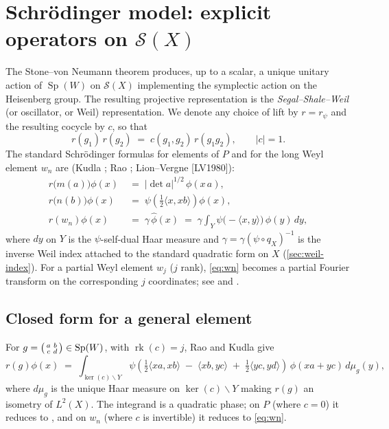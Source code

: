 \documentclass[11pt,letterpaper]{article}
\newcommand{\Sp}{\operatorname{Sp}}
\newcommand{\rk}{\operatorname{rk}}
\newcommand{\Schwartz}{\mathcal{S}}
\newcommand{\inv}{^{-1}}
\theoremstyle{plain}
\theoremstyle{definition}
\begin{document}
\section{Schr\"odinger model: explicit operators on \texorpdfstring{$\Schwartz(X)$}{S(X)}}
\label{sec:schrodinger}

The Stone--von Neumann theorem produces, up to a scalar, a unique unitary action of $\Sp(W)$ on $\Schwartz(X)$ implementing the symplectic action on the Heisenberg group. The resulting projective representation is the \emph{Segal--Shale--Weil} (or oscillator, or Weil) representation. We denote any choice of lift by $r = r_\psi$ and the resulting cocycle by $c$, so that
\begin{equation}\label{eq:cocycle-defining}
r(g_1)\,r(g_2) \;=\; c(g_1,g_2)\,r(g_1 g_2),\qquad |c| = 1.
\end{equation}
The standard Schr\"odinger formulas for elements of $P$ and for the long Weyl element $w_n$ are (Kudla \cite[Ch.~II, Prop.~2.3]{Kudla1996}; Rao \cite[\S 3]{Rao1993}; Lion--Vergne [LV1980]):
\begin{align}
r\bigl(m(a)\bigr)\phi(x) &\;=\; |\det a|^{1/2}\,\phi(x\,a),
\label{eq:Levi}\\[2pt]
r\bigl(n(b)\bigr)\phi(x) &\;=\; \psi\!\left(\tfrac{1}{2}\langle x,xb\rangle\right)\phi(x),
\label{eq:N}\\[2pt]
r(w_n)\phi(x) &\;=\; \gamma\,\widehat{\phi}(x)
\;=\; \gamma\int_{Y}\psi\bigl(-\langle x,y\rangle\bigr)\,\phi(y)\,dy,
\label{eq:wn}
\end{align}
where $dy$ on $Y$ is the $\psi$-self-dual Haar measure and $\gamma = \gamma(\psi\circ q_X)\inv$ is the inverse Weil index attached to the standard quadratic form on $X$ (\cref{sec:weil-index}). For a partial Weyl element $w_j$ ($j$ rank), \cref{eq:wn} becomes a partial Fourier transform on the corresponding $j$ coordinates; see \cite[\S 3]{Rao1993} and \cite[Ch.~I]{Kudla1996}.

\subsection*{Closed form for a general element}

For $g = \begin{psmallmatrix} a & b \\ c & d \end{psmallmatrix} \in \Sp(W)$, with $\rk(c) = j$, Rao \cite[Lemma 3.2]{Rao1993} and Kudla \cite[Prop.~2.3]{Kudla1996} give
\begin{equation}\label{eq:general-r}
r(g)\phi(x) \;=\; \int_{\ker(c)\backslash Y}
\psi\!\left(
  \tfrac{1}{2}\langle x a, x b\rangle
  \;-\; \langle x b, y c\rangle
  \;+\; \tfrac{1}{2}\langle y c, y d\rangle
\right)\,\phi(x a + y c)\,d\mu_g(y),
\end{equation}
where $d\mu_g$ is the unique Haar measure on $\ker(c)\backslash Y$ making $r(g)$ an isometry of $L^2(X)$. The integrand is a quadratic phase; on $P$ (where $c = 0$) it reduces to , and on $w_n$ (where $c$ is invertible) it reduces to \cref{eq:wn}.
\end{document}
